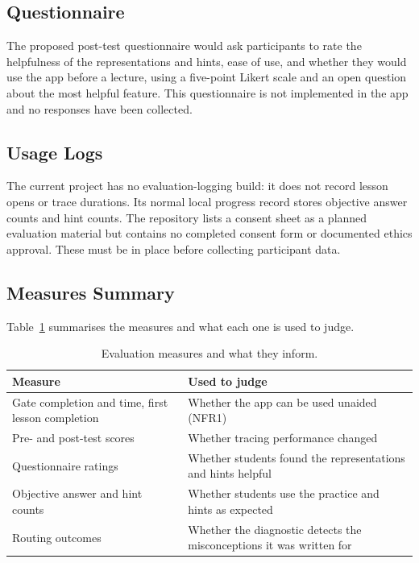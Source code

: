 \subsection{Questionnaire}
The proposed post-test questionnaire would ask participants to rate the helpfulness of the representations and hints, ease of use, and whether they would use the app before a lecture, using a five-point Likert scale and an open question about the most helpful feature. This questionnaire is not implemented in the app and no responses have been collected.

\subsection{Usage Logs}
The current project has no evaluation-logging build: it does not record lesson opens or trace durations. Its normal local progress record stores objective answer counts and hint counts. The repository lists a consent sheet as a planned evaluation material but contains no completed consent form or documented ethics approval. These must be in place before collecting participant data.

\subsection{Measures Summary}
Table~\ref{tab:measures} summarises the measures and what each one is used to judge.

\begin{table}[H]
\centering
\small
\caption{Evaluation measures and what they inform.}
\label{tab:measures}
\begin{tabularx}{\textwidth}{p{4.2cm} X}
\toprule
Measure & Used to judge \\
\midrule
Gate completion and time, first lesson completion & Whether the app can be used unaided (NFR1) \\
Pre- and post-test scores & Whether tracing performance changed \\
Questionnaire ratings & Whether students found the representations and hints helpful \\
Objective answer and hint counts & Whether students use the practice and hints as expected \\
Routing outcomes & Whether the diagnostic detects the misconceptions it was written for \\
\bottomrule
\end{tabularx}
\end{table}


